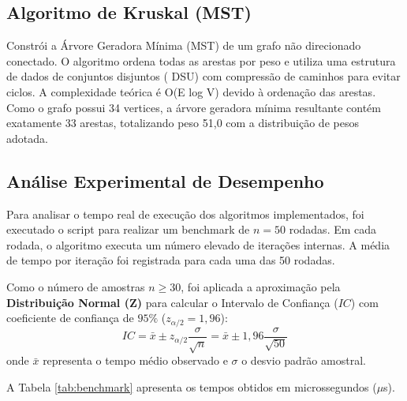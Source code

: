 \documentclass[sigconf,nonacm]{webmedia}
\begin{document}
\subsection{Algoritmo de Kruskal (MST)}
Constrói a Árvore Geradora Mínima (MST) de um grafo não direcionado conectado. O algoritmo ordena todas as arestas por peso e utiliza uma estrutura de dados de conjuntos disjuntos ( {DSU}) com compressão de caminhos para evitar ciclos. A complexidade teórica é O(E log V) devido à ordenação das arestas.
Como o grafo possui 34 vertices, a árvore geradora mínima resultante contém exatamente 33 arestas, totalizando peso 51,0 com a distribuição de pesos adotada.

\subsection{Análise Experimental de Desempenho}

Para analisar o tempo real de execução dos algoritmos implementados, foi executado o script  para realizar um benchmark de $n = 50$ rodadas. Em cada rodada, o algoritmo executa um número elevado de iterações internas. A média de tempo por iteração foi registrada para cada uma das 50 rodadas.

Como o número de amostras $n \ge 30$, foi aplicada a aproximação pela \textbf{Distribuição Normal (Z)} para calcular o Intervalo de Confiança ($IC$) com coeficiente de confiança de $95\%$ ($z_{\alpha/2} = 1,96$):
\begin{equation}
    IC = \bar{x} \pm z_{\alpha/2} \frac{\sigma}{\sqrt{n}} = \bar{x} \pm 1,96 \frac{\sigma}{\sqrt{50}}
\end{equation}
onde $\bar{x}$ representa o tempo médio observado e $\sigma$ o desvio padrão amostral.

A Tabela \ref{tab:benchmark} apresenta os tempos obtidos em microssegundos ($\mu$s).
\end{document}
